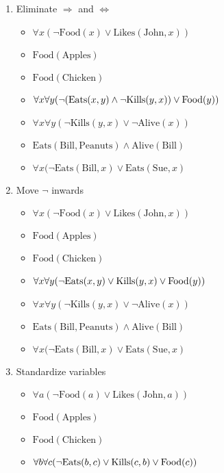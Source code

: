\documentclass[12pt]{article}
\begin{document}
\begin{enumerate}
\begin{enumerate}
			\begin{enumerate}[label=\arabic*.]
				\item Eliminate $\Rightarrow$ and $\Leftrightarrow$
					\begin{itemize}
						\item $\forall x (\neg \text{Food}(x) \lor \text{Likes}(\text{John}, x))$
						\item $\text{Food}(\text{Apples})$
						\item $\text{Food}(\text{Chicken})$
						\item $\forall x \forall y (\neg (\text{Eats}(x, y) \land \neg \text{\text{Kills}}(y, x)) \lor \text{Food}(y))$
						\item $\forall x \forall y (\neg \text{Kills}(y, x) \lor \neg \text{Alive}(x))$
						\item $\text{Eats}(\text{Bill}, \text{Peanuts}) \land \text{Alive}(\text{Bill})$
						\item $\forall x (\neg \text{Eats}(\text{Bill}, x) \lor \text{Eats}(\text{Sue}, x)$
					\end{itemize}
				\item Move $\neg$ inwards
					\begin{itemize}
						\item $\forall x (\neg \text{Food}(x) \lor \text{Likes}(\text{John}, x))$
						\item $\text{Food}(\text{Apples})$
						\item $\text{Food}(\text{Chicken})$
						\item $\forall x \forall y (\neg \text{Eats}(x, y) \lor  \text{\text{Kills}}(y, x) \lor \text{Food}(y))$
						\item $\forall x \forall y (\neg \text{Kills}(y, x) \lor \neg \text{Alive}(x))$
						\item $\text{Eats}(\text{Bill}, \text{Peanuts}) \land \text{Alive}(\text{Bill})$
						\item $\forall x (\neg \text{Eats}(\text{Bill}, x) \lor \text{Eats}(\text{Sue}, x)$
					\end{itemize}
				\item Standardize variables
					\begin{itemize}
						\item $\forall a (\neg \text{Food}(a) \lor \text{Likes}(\text{John}, a))$
						\item $\text{Food}(\text{Apples})$
						\item $\text{Food}(\text{Chicken})$
						\item $\forall b \forall c (\neg \text{Eats}(b, c) \lor  \text{\text{Kills}}(c, b) \lor \text{Food}(c))$

\end{itemize}
\end{enumerate}
\end{enumerate}
\end{enumerate}
\end{document}
